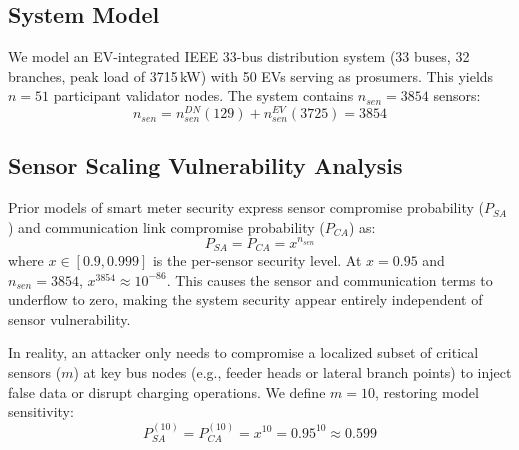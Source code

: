 \documentclass[10pt,twocolumn,journal]{IEEEtran}
\begin{document}
\subsection{System Model}

We model an EV-integrated IEEE 33-bus distribution system (33 buses, 32 branches, peak load of 3715\,kW) with 50 EVs serving as prosumers. This yields $n=51$ participant validator nodes. The system contains $n_{sen} = 3854$ sensors:
\begin{equation}
n_{sen} = n_{sen}^{DN} (129) + n_{sen}^{EV} (3725) = 3854
\end{equation}

\subsection{Sensor Scaling Vulnerability Analysis}

Prior models of smart meter security express sensor compromise probability ($P_{SA}$) and communication link compromise probability ($P_{CA}$) as:
\begin{equation}
P_{SA} = P_{CA} = x^{n_{sen}}
\end{equation}
where $x \in [0.9, 0.999]$ is the per-sensor security level. At $x = 0.95$ and $n_{sen}=3854$, $x^{3854} \approx 10^{-86}$. This causes the sensor and communication terms to underflow to zero, making the system security appear entirely independent of sensor vulnerability.

In reality, an attacker only needs to compromise a localized subset of critical sensors ($m$) at key bus nodes (e.g., feeder heads or lateral branch points) to inject false data or disrupt charging operations. We define $m = 10$, restoring model sensitivity:
\begin{equation}
P_{SA}^{(10)} = P_{CA}^{(10)} = x^{10} = 0.95^{10} \approx 0.599
\end{equation}
\end{document}
